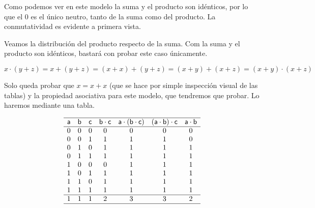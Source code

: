 	Como podemos ver en este modelo la suma y el producto son idénticos, por
lo que el \(0\) es el único neutro, tanto de la suma como del producto. La
conmutatividad es evidente a primera vista. 


	Veamos la distribución del producto respecto de la suma. Com la suma y el
producto son idénticos, bastará con probar este caso únicamente.



\begin{equation}
x \cdot (y + z) = x + ( y + z ) = ( x + x ) + ( y + z ) = ( x + y ) + ( x + z
) = ( x + y ) \cdot ( x + z )
\end{equation}



	Solo queda probar que \(x = x + x\) (que se hace por simple inspección
visual de las tablas) y la propiedad asociativa para este modelo, que
tendremos que probar. Lo haremos mediante una tabla.



\begin{equation}
  \begin{matrix}
  \hline
  \mathsf{a} & \mathsf{b} & \mathsf{c} & \mathsf{b}\cdot\mathsf{c} &
  \mathsf{a}\cdot\left( \mathsf{b} \cdot \mathsf{c} \right) &
  \left(\mathsf{a}\cdot \mathsf{b}\right) \cdot \mathsf{c} &
  \mathsf{a}\cdot\mathsf{b}\\
  \hline
  0 & 0 & 0 & 0 & 0    & 0 & 0 \\
  0 & 0 & 1 & 1 & 1    & 1 & 0 \\
  0 & 1 & 0 & 1 & 1    & 1 & 1 \\
  0 & 1 & 1 & 1 & 1    & 1 & 1 \\
  1 & 0 & 0 & 0 & 1    & 1 & 1 \\
  1 & 0 & 1 & 1 & 1    & 1 & 1 \\
  1 & 1 & 0 & 1 & 1    & 1 & 1 \\
  1 & 1 & 1 & 1 & 1    & 1 & 1 \\
  \hline
  1 & 1 & 1 & 2 & 3    & 3 & 2 \\
  \hline
  \end{matrix}
\end{equation}

